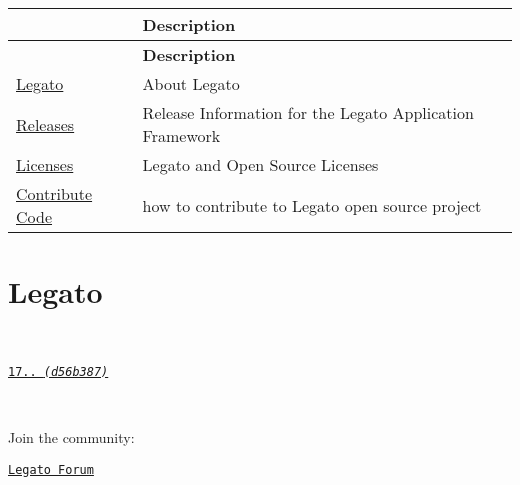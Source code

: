 \tabulinesep=1mm
\begin{longtabu} spread 0pt [c]{*2{|X[-1]}|}
\hline
{}&{\bf Description  }\\
\endfirsthead
\hline
\endfoot
\hline
{}&{\bf Description  }\\
\endhead
\hyperlink{aboutLegato}{Legato} &About Legato \\
\hyperlink{aboutReleaseInfo}{Releases} &Release Information for the Legato Application Framework \\
\hyperlink{aboutLicenses}{Licenses} &Legato and Open Source Licenses \\
\hyperlink{aboutLegatoContributing}{Contribute Code} &how to contribute to Legato open source project \\
\end{longtabu}
\hypertarget{aboutLegato}{}\section{Legato}\label{aboutLegato}
~\newline
 ~\newline
 ~\newline
 ~\newline


\begin{center}\end{center} 

\begin{center}\href{#}{\tt 17.. {\itshape (d56b387)}}\end{center} 

\begin{center}~\newline
 ~\newline
\end{center} 

\begin{center}Join the community\+:\end{center} 

\begin{center}\href{http://forum.legato.io/}{\tt Legato Forum}\end{center} 

\begin{center}~\newline
 ~\newline
\end{center} 

